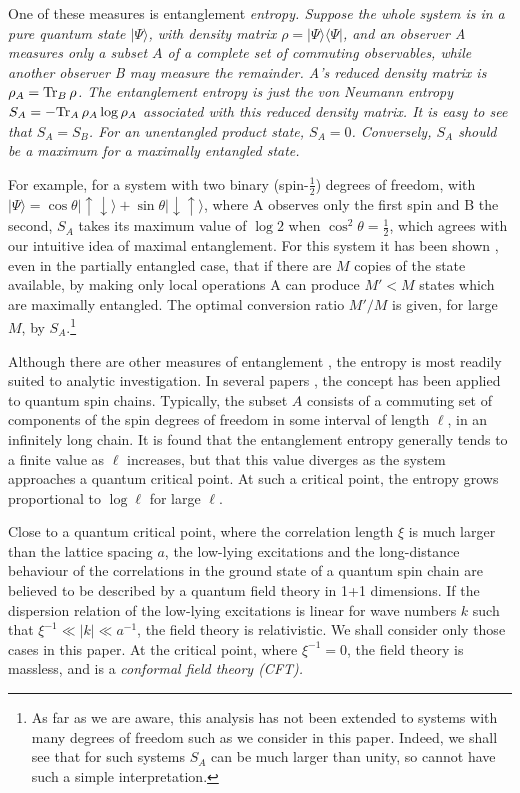 \documentclass[12pt,aps,nofootinbib]{revtex4-1}
\begin{document}
One of these measures \cite{Bennett}
is entanglement \em entropy\em. Suppose the whole
system is in a pure quantum state $|\Psi\rangle$, with density matrix
$\rho=|\Psi\rangle\langle\Psi|$, and an observer A measures only a
subset $A$ of a complete set of commuting observables, while another
observer B may measure the remainder. A's reduced density matrix is
$\rho_A={\rm Tr}_B\,\rho$. The entanglement entropy is just the von
Neumann entropy $S_A=-{\rm Tr}_A\,\rho_A\log\rho_A$ associated with this
reduced density matrix. It is easy to see that $S_A=S_B$. For an
unentangled product state, $S_A=0$. Conversely, $S_A$ should be a
maximum for a maximally entangled state.

For example, for a system with
two binary (spin-$\frac12$) degrees of freedom, with
$|\Psi\rangle=\cos\theta|\uparrow\downarrow\rangle+\sin\theta|\downarrow
\uparrow\rangle$, where A observes only the first spin and B the second,
$S_A$ takes its maximum value of $\log 2$ when $\cos^2\theta=\frac12$, which
agrees with our intuitive idea of maximal entanglement.
For this system it has been shown \cite{Bennett}, even in the partially
entangled case, that if there are $M$
copies of the state available, by making only local operations A can
produce $M'<M$ states which are maximally entangled. The optimal
conversion ratio $M'/M$ is given, for large $M$, by $S_A$.\footnote{As
far as we are aware, this analysis has not been extended to systems with
many degrees of freedom such as we consider in this paper. Indeed, we
shall see that for such systems $S_A$ can be much larger than unity, so
cannot have such a simple interpretation.}

Although there are other measures of entanglement \cite{othermeasures},
the entropy is most readily suited to analytic investigation.
In several papers \cite{Vidal,Korepin,leb,Casini},
the concept has been applied to quantum spin chains.
Typically, the subset $A$ consists of a commuting set of components of
the spin degrees of freedom in some interval of length $\ell$, in an
infinitely long chain. It is found that the entanglement entropy
generally tends to a finite value as $\ell$ increases, but that this
value diverges as the system approaches a quantum critical point.
At such a critical point, the entropy grows proportional to $\log\ell$
for large $\ell$.

Close to a quantum critical point, where the correlation length $\xi$ is
much larger than the lattice spacing $a$, the low-lying excitations and
the long-distance behaviour of the correlations in the ground state of
a quantum spin chain are believed to be described by a quantum field
theory in 1+1 dimensions.
If the dispersion relation of the low-lying excitations is linear for
wave numbers $k$ such that $\xi^{-1}\ll|k|\ll a^{-1}$, the field theory
is relativistic. We shall consider only those cases in this paper.
At the critical point, where $\xi^{-1}=0$, the field theory is massless,
and is a \em conformal \em field theory (CFT).
\end{document}
